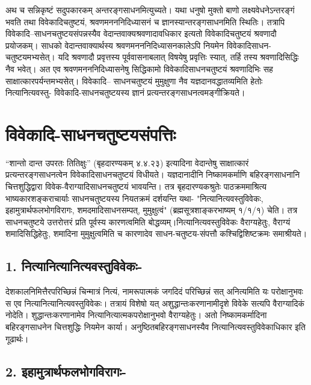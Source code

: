 {अथ च सन्निकृष्टं सदुपकारकम् अन्तरङ्गसाधनमित्युच्यते। यथा धनुषो मुक्तो बाणो लक्ष्यवेधनेऽन्तरङ्गं भवति तथा विवेकादिचतुष्टयं, श्रवणमनननिदिध्यासनं च ज्ञानस्यान्तरङ्गसाधनमिति स्थितिः। तत्रापि विवेकादि–साधनचतुष्टयसंपन्नस्यैव वेदान्तवाक्यश्रवणादावधिकार इत्यतो विवेकादिचतुष्टयं श्रवणादौ प्रयोजकम्। साधको वेदान्तवाक्यार्थस्य श्रवणमनननिदिध्यासनकालेऽपि नियमेन विवेकादिसाधन- चतुष्टयमभ्यसेत्। यदि श्रवणादौ प्रवृत्तस्य पूर्ववासनाबलात् विषयेषु प्रवृत्तिः स्यात्, तर्हि तस्य श्रवणादिसिद्धिः नैव भवेत्। अत एव श्रवणमनननिदिध्यासनेषु सिद्धिकामो विवेकादिसाधनचतुष्टयं श्रवणादिभिः सह साक्षात्कारपर्यन्तमभ्यसेत्। विवेकादि– साधनचतुष्टयं मुमुक्षुणा नैव यज्ञदानवद्धातव्यमिति हेतोः नित्यानित्यवस्तु- विवेकादि-साधनचतुष्टयस्य ज्ञानं प्रत्यन्तरङ्गसाधनत्वमङ्गीक्रियते।

\section*{विवेकादि-साधनचतुष्टयसंपत्तिः}

“शान्तो दान्त उपरतः तितिक्षुः” (बृहदारण्यकम् ४.४.२३) इत्यादिना वेदान्तेषु साक्षात्कारं प्रत्यन्तरङ्गसाधनत्वेन विवेकादिसाधनचतुष्टयं विधीयते। यज्ञदानादीनि निष्कामकर्माणि बहिरङ्गसाधनानि चित्तशुद्धिद्वारा विवेक-वैराग्यादिसाधनचतुष्टयं भावयन्ति। तत्र बृहदारण्यकश्रुतेः पाठक्रममाश्रित्य भाष्यकारशङ्कराचार्याः साधनचतुष्टयस्य नियतक्रमं दर्शयन्ति यथा- "नित्यानित्यवस्तुविवेकः, इहामुत्रार्थफलभोगविरागः, शमदमादिसाधनसम्पत्, मुमुक्षुत्वं" (ब्रह्मसूत्रशाङ्करभाष्यम् १/१/१) चेति। तत्र साधनचतुष्टये उत्तरोत्तरं प्रति पूर्वस्य कारणत्वमिति बोद्धव्यम्।नित्यानित्यवस्तुविवेकः वैराग्यहेतुः, वैराग्यं शमादिसिद्धिहेतुः, शमादिना मुमुक्षुत्वमिति च कारणादेव साधन-चतुष्टय-संपत्तौ कश्चिद्विशिष्टक्रमः समाश्रीयते।

\subsection*{1. नित्यानित्यानित्यवस्तुविवेकः-}

देशकालनिमित्तैरपरिच्छिन्नं चिन्मात्रं नित्यं, नामरूपात्मकं जगदिदं परिच्छिन्नं सत् अनित्यमिति यः परोक्षानुभवः स एव नित्यानित्यानित्यवस्तुविवेकः। तत्रायं विशेषो यत् अशुद्धान्तःकरणानामीदृशे विवेके सत्यपि वैराग्यादिकं नोदेति। शुद्धान्तःकरणानामेव नित्यानित्यात्मकपरोक्षानुभवो वैराग्यहेतुः। अतो निष्कामकर्मादिना बहिरङ्गसाधनेन चित्तशुद्धिः नियमेन कार्या। अनुष्ठितबहिरङ्गसाधनस्यैव नित्यानित्यवस्तुविवेकाधिकार इति गूढार्थः।

\subsection*{2. इहामुत्रार्थफलभोगविरागः-}

}
